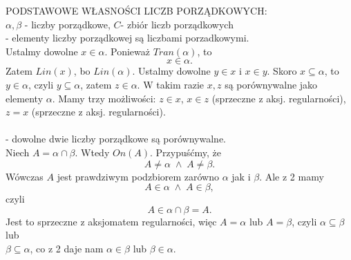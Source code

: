 {\large\color{def}PODSTAWOWE WŁASNOŚCI LICZB PORZĄDKOWYCH:}\medskip\\
$\alpha, \beta$ - liczby porządkowe, $C$- zbiór liczb porządkowych\medskip\\
 - elementy liczby porządkowej są liczbami porzadkowymi.\smallskip\\
Ustalmy dowolne $x\in\alpha.$ Ponieważ $Tran(\alpha)$, to
$$x\in\alpha.$$
Zatem $Lin(x)$, bo $Lin(\alpha)$. Ustalmy dowolne $y\in x$ i $x\in y$. Skoro $x\subseteq \alpha$, to $y\in\alpha$, czyli $y\subseteq \alpha$, zatem $z\in \alpha$. W takim razie $x, z$ są porównywalne jako elementy $\alpha$. Mamy trzy możliwości: $z\in x$, $x\in z$ (sprzeczne z aksj. regularności), $z=x$ (sprzeczne z aksj. regularności).\medskip\\
\medskip\\
 - dowolne dwie liczby porządkowe są porównywalne.\smallskip\\
Niech $A=\alpha\cap\beta$. Wtedy $On(A)$. Przypuśćmy, że
$$A\neq \alpha\;\land\;A\neq\beta.$$
Wówczas $A$ jest prawdziwym podzbiorem zarówno $\alpha$ jak i $\beta$. Ale z 2 mamy
$$A\in \alpha\;\land\;A\in\beta,$$
czyli
$$A\in \alpha\cap\beta=A.$$
Jest to sprzeczne z aksjomatem regularności, więc $A=\alpha$ lub $A=\beta$, czyli $\alpha\subseteq \beta$ lub \\$\beta\subseteq\alpha$, co z 2 daje nam $\alpha\in \beta$ lub $\beta\in\alpha$.\medskip\\
\medskip\\
